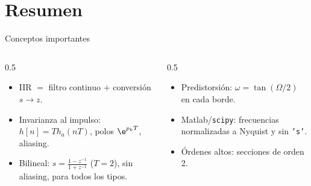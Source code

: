 \documentclass[aspectratio=169,11pt]{beamer}
\begin{document}
\section*{Resumen}
\begin{frame}{Conceptos importantes}
  \begin{columns}[T]
    \begin{column}{0.5\textwidth}
      \begin{itemize}
        \item IIR $=$ filtro continuo $+$ conversión $s\to z$.
        \item Invarianza al impulso: $h[n]=Th_a(nT)$, polos $\e^{p_kT}$, aliasing.
        \item Bilineal: $s=\frac{1-z^{-1}}{1+z^{-1}}$ ($T=2$), sin aliasing, para todos los tipos.
      \end{itemize}
    \end{column}
    \begin{column}{0.5\textwidth}
      \begin{itemize}
        \item Predistorsión: $\omega=\tan(\Omega/2)$ en cada borde.
        \item Matlab/\texttt{scipy}: frecuencias normalizadas a Nyquist y sin \texttt{'s'}.
        \item Órdenes altos: secciones de orden 2.
      \end{itemize}
    \end{column}
  \end{columns}
  \bigskip
\end{frame}
\end{document}

